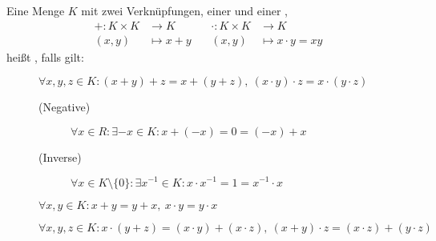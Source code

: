 Eine Menge $K$ mit zwei Verknüpfungen, einer  und einer , 
\begin{align*}
    + : K \times K & \longrightarrow K \hspace{1cm} &
    \cdot : K \times K & \longrightarrow K
    \\
    (x, y) & \longmapsto x + y &
    (x, y) & \longmapsto x \cdot y = xy
\end{align*}
heißt , falls gilt:
\begin{description}
    \item[] $\forall x, y, z \in K : (x+y)+z = x+(y+z), \ (x \cdot y) \cdot z = x \cdot (y \cdot z)$
    \item[]
    \item[] 
        \begin{description}
            \item[(Negative)] $\forall x \in R : \exists -x \in K : x + (-x) = 0 = (-x) + x$
            \item[(Inverse)] $\forall x \in K \setminus \{0\} : \exists x^{-1} \in K : x \cdot x^{-1} = 1 = x^{-1} \cdot x$
        \end{description}
    \item[] $\forall x, y \in K : x+y=y+x, \ x \cdot y = y \cdot x$
    \item[] $\forall x, y, z \in K : x \cdot (y+z) = (x \cdot y) + (x \cdot z), \ (x+y) \cdot z = (x \cdot z) + (y \cdot z)$
\end{description}